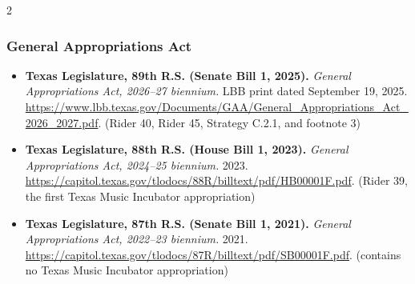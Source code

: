 {\begin{multicols}{2}
\subsubsection*{General Appropriations Act}
\begin{itemize}[itemsep=0pt,topsep=1pt,parsep=0pt,partopsep=0pt,leftmargin=1em]
\item \textbf{Texas Legislature, 89th R.S. (Senate Bill 1, 2025).} \textit{General Appropriations Act, 2026--27 biennium.} LBB print dated September 19, 2025. \url{https://www.lbb.texas.gov/Documents/GAA/General_Appropriations_Act_2026_2027.pdf}. {\color{ammuted}(Rider 40, Rider 45, Strategy C.2.1, and footnote 3)}
\item \textbf{Texas Legislature, 88th R.S. (House Bill 1, 2023).} \textit{General Appropriations Act, 2024--25 biennium.} 2023. \url{https://capitol.texas.gov/tlodocs/88R/billtext/pdf/HB00001F.pdf}. {\color{ammuted}(Rider 39, the first Texas Music Incubator appropriation)}
\item \textbf{Texas Legislature, 87th R.S. (Senate Bill 1, 2021).} \textit{General Appropriations Act, 2022--23 biennium.} 2021. \url{https://capitol.texas.gov/tlodocs/87R/billtext/pdf/SB00001F.pdf}. {\color{ammuted}(contains no Texas Music Incubator appropriation)}
\end{itemize}

\end{multicols}}
